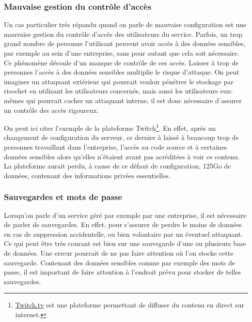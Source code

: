 \documentclass[a4paper, 12pt]{article}
\begin{document}
      \subsubsection{Mauvaise gestion du contrôle d'accès}
        Un cas particulier très répandu quand on parle de mauvaise configuration
        est une mauvaise gestion du contrôle d'accès des utilisateurs du
        service. Parfois, un trop grand nombre de personne l'utilisant peuvent
        avoir accès à des données sensibles, par exemple au sein d'une
        entreprise, sans pour autant que cela soit nécessaire. Ce phénomène
        découle d'un manque de contrôle de ces accès. Laisser à trop de
        personnes l'accès à des données sensibles multiplie le risque d'attaque.
        On peut imaginer un attaquant extérieur qui pourrait vouloir pénétrer le
        stockage par ricochet en utilisant les utilisateurs concernés, mais
        aussi les utilisateurs eux-mêmes qui pourrait cacher un attaquant
        interne, il est donc nécessaire d'assurer un contrôle des accès
        rigoureux.

        On peut ici citer l'exemple de la plateforme Twitch\footnote{
        \url{Twitch.tv} est une plateforme permettant de diffuser du contenu en
        direct sur internet.}. En effet, après un changement de configuration du
        serveur, ce dernier à laissé à beaucoup trop de personnes travaillant
        dans l'entreprise, l'accès au code source et à certaines données
        sensibles alors qu'elles n'étaient avant pas acréditées à voir ce
        contenu. La plateforme aurait perdu, à cause de ce défaut de
        configuration, 125Go de données, contenant des informations privées
        essentielles.

      \subsubsection{Sauvegardes et mots de passe}
        Lorsqu'on parle d'un service géré par exemple par une entreprise, il est
        nécessaire de parler de sauvegardes. En effet, pour s'assurer de perdre
        le moins de données en cas de suppression accidentelle, ou bien
        volontaire par un éventuel attaquant. Ce qui peut être très courant est
        bien sur une sauvegarde d'une ou plusieurs base de données. Une erreur
        pourrait de ne pas faire attention où l'on stocke cette sauvegarde.
        Contenant des données sensibles comme par exemple des mots de passe,
        il est important de faire attention à l'endroit prévu pour stocker de
        telles sauvegardes.
\end{document}

